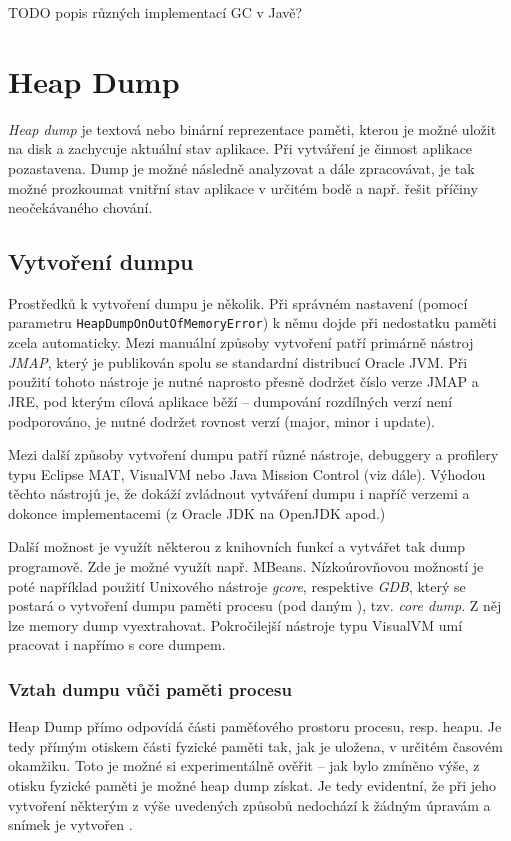 TODO popis různých implementací GC v Javě?

\section{Heap Dump}
\textit{Heap dump} je textová nebo binární reprezentace paměti, kterou je možné uložit na disk a zachycuje aktuální stav aplikace. Při vytváření je činnost aplikace pozastavena. Dump je možné následně analyzovat a dále zpracovávat, je tak možné prozkoumat vnitřní stav aplikace v určitém bodě a např. řešit příčiny neočekávaného chování. 

\subsection{Vytvoření dumpu}
Prostředků k vytvoření dumpu je několik. Při správném nastavení (pomocí parametru \texttt{HeapDumpOnOutOfMemoryError}) k němu dojde při nedostatku paměti zcela automaticky. Mezi manuální způsoby vytvoření patří primárně nástroj \textit{JMAP}, který je publikován spolu se standardní distribucí Oracle JVM. Při použití tohoto nástroje je nutné naprosto přesně dodržet číslo verze JMAP a JRE, pod kterým cílová aplikace běží – dumpování rozdílných verzí není podporováno, je nutné dodržet rovnost verzí (major, minor i update).

Mezi další způsoby vytvoření dumpu patří různé nástroje, debuggery a profilery typu Eclipse MAT, VisualVM nebo Java Mission Control (viz dále). Výhodou těchto nástrojů je, že dokáží zvládnout vytváření dumpu i napříč verzemi a dokonce implementacemi (z Oracle JDK na OpenJDK apod.)

Další možnost je využít některou z knihovních funkcí a vytvářet tak dump programově. Zde je možné využít např. MBeans. Nízkoúrovňovou možností je poté například použití Unixového nástroje \textit{gcore}, respektive \textit{GDB}, který se postará o vytvoření dumpu paměti procesu (pod daným ), tzv. \textit{core dump}. Z něj lze memory dump vyextrahovat. Pokročilejší nástroje typu VisualVM umí pracovat i napřímo s core dumpem.

\subsubsection{Vztah dumpu vůči paměti procesu}
Heap Dump přímo odpovídá části paměťového prostoru procesu, resp. heapu. Je tedy přímým otiskem části fyzické paměti tak, jak je uložena, v určitém časovém okamžiku. Toto je možné si experimentálně ověřit -- jak bylo zmíněno výše, z otisku fyzické paměti je možné heap dump získat. Je tedy evidentní, že při jeho vytvoření některým z výše uvedených způsobů nedochází k žádným úpravám a snímek je vytvořen . 

